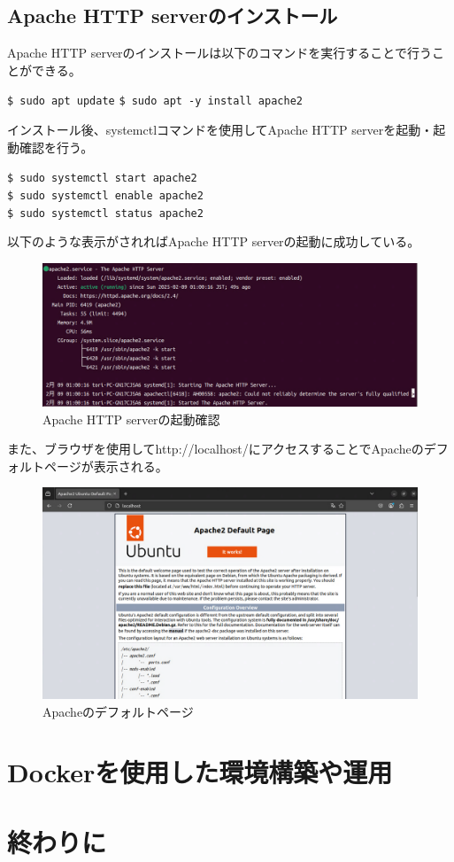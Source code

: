 \documentclass[a4paper, 11pt, dvipdfmx]{jsarticle}
\begin{document}
\subsection{Apache HTTP serverのインストール}
Apache HTTP serverのインストールは以下のコマンドを実行することで行うことができる。
\begin{terminalbox}
  \verb|$ sudo apt update|
  \verb|$ sudo apt -y install apache2|
\end{terminalbox}
インストール後、systemctlコマンドを使用してApache HTTP serverを起動・起動確認を行う。
\begin{terminalbox}
  \verb|$ sudo systemctl start apache2|\\
  \verb|$ sudo systemctl enable apache2|\\
  \verb|$ sudo systemctl status apache2|
\end{terminalbox}
以下のような表示がされればApache HTTP serverの起動に成功している。
\begin{figure}[H]
  \centering
  \includegraphics[width=14cm]{images/linux-server/12_3_status-apache.png}
  \caption{Apache HTTP serverの起動確認}
\end{figure}
また、ブラウザを使用してhttp://localhost/にアクセスすることでApacheのデフォルトページが表示される。
\begin{figure}[H]
  \centering
  \includegraphics[width=14cm]{images/linux-server/12_3-2_welcompage.png}
  \caption{Apacheのデフォルトページ}
\end{figure}
\section{Dockerを使用した環境構築や運用}

\section{終わりに}
\end{document}

